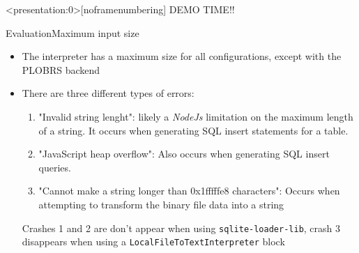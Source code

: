 \begin{frame}<presentation:0>[noframenumbering]
	\centering
	\large
	DEMO TIME!!
\end{frame}

\begin{frame}[t]{Evaluation}{Maximum input size}
	\begin{itemize}
		\item The interpreter has a maximum size for all configurations, except with the PLOBRS backend
		\item There are three different types of errors:
		      \begin{enumerate}
			      \item "Invalid string lenght": likely a \emph{NodeJs} limitation on the maximum length of a string. It occurs when generating SQL insert statements for a table.
			      \item "JavaScript heap overflow": Also occurs when generating SQL insert queries.
			      \item "Cannot make a string longer than 0x1fffffe8 characters": Occurs when attempting to transform the binary file data into a string
		      \end{enumerate}
		      Crashes 1 and 2 are don't appear when using \Verb|sqlite-loader-lib|, crash 3 disappears when using a \Verb|LocalFileToTextInterpreter| block
	\end{itemize}
	\begin{figure}
		\centering
	\end{figure}
\end{frame}

